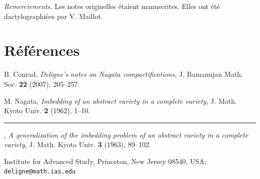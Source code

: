 \documentclass[10pt,a4paper]{article}
\theoremstyle{deligne}
\begin{document}
\textit{Remerciements.} Les notes originelles étaient manuscrites. Elles ont été dactylographiées par V. Maillot.

\section*{Références}
\begin{enumerate}[label={[\arabic*]},leftmargin=2.8em]
\item B. Conrad, \textit{Deligne's notes on Nagata compactifications}, J. Ramanujan Math. Soc. \textbf{22} (2007), 205--257.
\item M. Nagata, \textit{Imbedding of an abstract variety in a complete variety}, J. Math. Kyoto Univ. \textbf{2} (1962), 1--10.
\item \rule{2.5em}{0.4pt}, \textit{A generalization of the imbedding problem of an abstract variety in a complete variety}, J. Math. Kyoto Univ. \textbf{3} (1963), 89--102.
\end{enumerate}

Institute for Advanced Study, Princeton, New Jersey 08540, USA;\\
\texttt{deligne@math.ias.edu}
\end{document}
